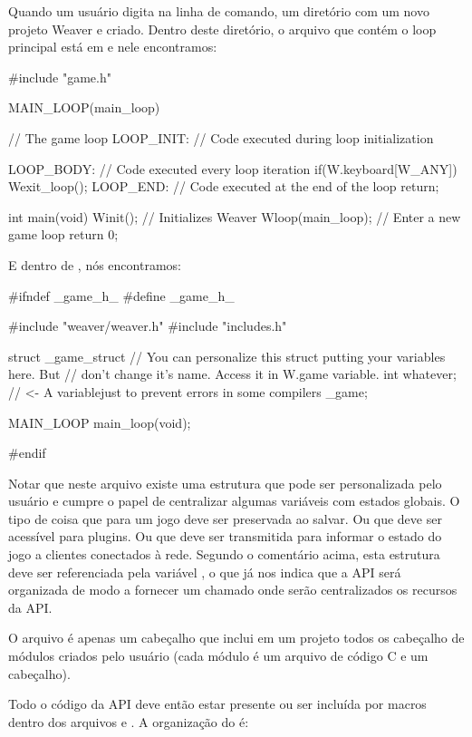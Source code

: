 
Quando um usuário digita  na linha de
comando, um diretório com um novo projeto Weaver e criado. Dentro
deste diretório, o arquivo que contém o loop principal está
em  e nele encontramos:

\alinhaverbatim
#include "game.h"

MAIN_LOOP(main_loop){ // The game loop
 LOOP_INIT: // Code executed during loop initialization

 LOOP_BODY: // Code executed every loop iteration
    if(W.keyboard[W_ANY])
        Wexit_loop();
 LOOP_END: // Code executed at the end of the loop
    return;
}

int main(void){
  Winit(); // Initializes Weaver
  Wloop(main_loop); // Enter a new game loop
  return 0;
}
\alinhanormal

E dentro de , nós encontramos:

\alinhaverbatim
#ifndef _game_h_
#define _game_h_

#include "weaver/weaver.h"
#include "includes.h"

struct _game_struct{
  // You can personalize this struct putting your variables here. But
  // don't change it's name. Access it in W.game variable.
  int whatever; // <- A variablejust  to prevent errors in some compilers
} _game;

MAIN_LOOP main_loop(void);

#endif
\alinhanormal

Notar que neste arquivo existe uma estrutura que pode ser
personalizada pelo usuário e cumpre o papel de centralizar algumas
variáveis com estados globais. O tipo de coisa que para um jogo deve
ser preservada ao salvar. Ou que deve ser acessível para plugins. Ou
que deve ser transmitida para informar o estado do jogo a clientes
conectados à rede. Segundo o comentário acima, esta estrutura deve ser
referenciada pela variável , o que já nos indica
que a API será organizada de modo a fornecer um 
chamado  onde serão centralizados os recursos da API.

O arquivo  é apenas um cabeçalho que inclui em
um projeto todos os cabeçalho de módulos criados pelo usuário (cada
módulo é um arquivo de código C e um cabeçalho).

Todo o código da API deve então estar presente ou ser incluída por
macros dentro dos arquivos 
e . A organização do  é:

